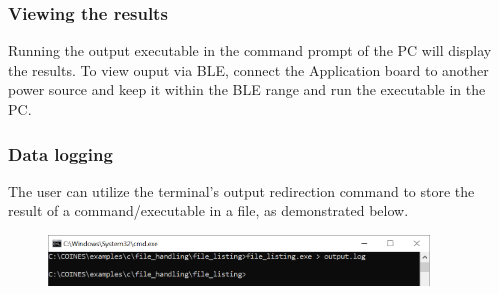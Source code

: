 \documentclass{article}
\begin{document}
\subsubsection{Viewing the results}
Running the output executable in the command prompt of the PC will display the results. To view ouput via BLE, connect the Application board to another power source and keep it within the BLE range and run the executable in the PC.

\subsubsection{Data logging}

The user can utilize the terminal's output redirection command to store the result of a command/executable in a file, as demonstrated below.
\begin{figure}[H]
	\begin{center}
		\includegraphics[width=0.9\textwidth]{coinesAPI_images/PC_data_logging.png}
	\end{center}
\end{figure}
\end{document}
